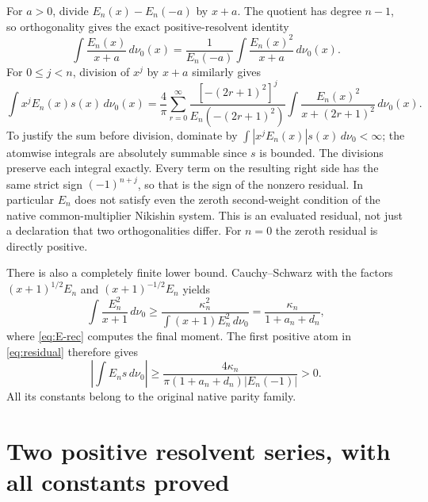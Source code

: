\documentclass[11pt]{article}
\begin{document}
For $a>0$, divide $E_n(x)-E_n(-a)$ by $x+a$. The quotient has
degree $n-1$, so orthogonality gives the exact positive-resolvent
identity
\begin{equation}\label{eq:residual-atom}
 \int\frac{E_n(x)}{x+a}\,d\nu_0(x)
  =\frac1{E_n(-a)}\int\frac{E_n(x)^2}{x+a}\,d\nu_0(x).
\end{equation}
For $0\leq j<n$, division of $x^j$ by $x+a$ similarly gives
\begin{equation}\label{eq:residual}
 \int x^jE_n(x)s(x)\,d\nu_0(x)
 =\frac4\pi\sum_{r=0}^{\infty}
 \frac{[-(2r+1)^2]^j}{E_n(-(2r+1)^2)}
 \int\frac{E_n(x)^2}{x+(2r+1)^2}\,d\nu_0(x).
\end{equation}
To justify the sum before division, dominate by
$\int|x^jE_n(x)|s(x)\,d\nu_0<\infty$; the atomwise integrals are
absolutely summable since $s$ is bounded. The divisions preserve
each integral exactly. Every term on the resulting right side
has the same strict sign $(-1)^{n+j}$, so that is the sign of the
nonzero residual. In particular $E_n$ does not satisfy even the
zeroth second-weight condition of the native common-multiplier
Nikishin system. This is an evaluated residual, not just a
declaration that two orthogonalities differ. For $n=0$ the
zeroth residual is directly positive.

There is also a completely finite lower bound. Cauchy--Schwarz
with the factors $(x+1)^{1/2}E_n$ and $(x+1)^{-1/2}E_n$ yields
\[
 \int\frac{E_n^2}{x+1}\,d\nu_0
 \geq\frac{\kappa_n^2}{\int(x+1)E_n^2\,d\nu_0}
 =\frac{\kappa_n}{1+a_n+d_n},
\]
where \eqref{eq:E-rec} computes the final moment. The first
positive atom in \eqref{eq:residual} therefore gives
\begin{equation}\label{eq:residual-lower}
 \left|\int E_n s\,d\nu_0\right|
 \geq\frac{4\kappa_n}{\pi(1+a_n+d_n)|E_n(-1)|}>0.
\end{equation}
All its constants belong to the original native parity family.

\section{Two positive resolvent series, with all constants proved}
\end{document}
